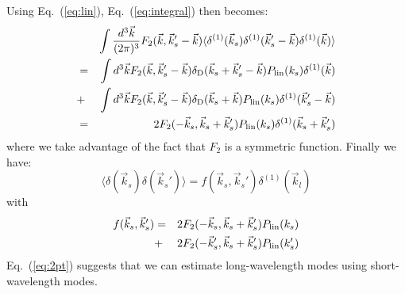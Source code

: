 \documentclass[prd,amsmath,amssymb,floatfix,superscriptaddress,nofootinbib,twocolumn]{revtex4-1}
\def\be{\begin{equation}}
\def\ee{\end{equation}}
\def\bea{\begin{eqnarray}}
\def\eea{\end{eqnarray}}
\newcommand{\vs}{\nonumber\\}
\newcommand{\vk}{\vec{k}}
\newcommand{\ec}[1]{Eq.~(\ref{eq:#1})}
\newcommand{\eql}[1]{\label{eq:#1}}
\newcommand{\RC}[1]{{\color{darkorange} #1}}
\begin{document}
Using \ec{lin}, \ec{integral} then becomes:
\bea 
&&\int \frac{d^3\vec{k}}{(2\pi)^3} F_2 (\vec{k},\vec{k}_s'-\vec{k})\langle {\delta}^{(1)}(\vec{k}_s){\delta}^{(1)}(\vec{k}_s'-\vec{k}){\delta}^{(1)}(\vec{k}) \rangle \vs
&=&\int d^3\vk F_2(\vec{k},\vec{k}_s'-\vec{k}) \delta_{\rm D}(\vk_s+\vk_s'-\vk)P_{\rm lin}(k_s){\delta}^{(1)}(\vec{k}) \vs
&+&\int d^3\vk F_2(\vec{k},\vec{k}_s'-\vec{k}) \delta_{\rm D}(\vk_s+\vk)P_{\rm lin}(k_s){\delta}^{(1)}(\vk_s'-\vk) \vs
&=&2F_2(-\vk_s,\vk_s+\vk_s')P_{\rm lin}(k_s){\delta}^{(1)}(\vk_s+\vk_s')
\eea 
where we take advantage of the fact that $F_2$ is a symmetric function. Finally we have:
\be 
\langle {\delta}(\vec{k}_s){\delta}(\vec{k}_s') \rangle =f(\vec{k}_s,\vec{k}_s'){\delta}^{(1)}(\vec{k}_l) \eql{2pt}
\ee 
with
\bea
f(\vec{k}_s,\vec{k}_s')&=&2F_2(-\vec{k}_s,\vec{k}_s+\vec{k}_s')P_{\rm lin}(k_s)\vs
&+&2F_2(-\vec{k}_s',\vec{k}_s+\vec{k}_s')P_{\rm lin}(k_s')       
\eea 
\ec{2pt} suggests that we can estimate long-wavelength modes using short-wavelength modes.
\end{document}

